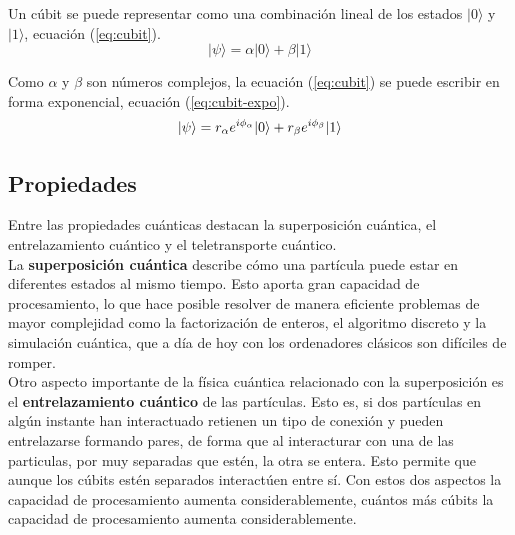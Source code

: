\newpage
Un cúbit se puede representar como una combinación lineal de los estados $|0\rangle$ y $|1\rangle$, ecuación (\ref{eq:cubit}).\\

\begin{equation}\label{eq:cubit}
|\psi \rangle = \alpha|0\rangle + \beta |1\rangle
\end{equation}

Como $\alpha$ y $\beta$ son números complejos, la ecuación (\ref{eq:cubit}) se puede escribir en forma exponencial, ecuación (\ref{eq:cubit-expo}).\\

\begin{equation}\label{eq:cubit-expo}
|\psi\rangle = r_{\alpha} e^{i\phi_{\alpha}}|0\rangle + r_{\beta} e^{i\phi_{\beta}}|1\rangle\\
\end{equation}

\vspace{1em}
\subsection{Propiedades}
Entre las propiedades cuánticas destacan la superposición cuántica, el entrelazamiento cuántico y el teletransporte cuántico.\\

La \textbf{superposición cuántica} describe cómo una partícula puede estar en diferentes estados al mismo tiempo. Esto aporta gran capacidad de procesamiento, lo que hace posible resolver de manera eficiente problemas de mayor complejidad como la factorización de enteros, el algoritmo discreto y la simulación cuántica, que a día de hoy con los ordenadores clásicos son difíciles de romper.\\

Otro aspecto importante de la física cuántica relacionado con la superposición es el \textbf{entrelazamiento cuántico} de las partículas\cite{cumputacion-cuantica-clasica}. Esto es, si dos partículas en algún instante han interactuado retienen un tipo de conexión y pueden entrelazarse formando pares, de forma que al interacturar con una de las particulas, por muy separadas que estén, la otra se entera. Esto permite que aunque los cúbits estén separados interactúen entre sí. Con estos dos aspectos la capacidad de procesamiento aumenta considerablemente, cuántos más cúbits la capacidad de procesamiento aumenta considerablemente.\\

